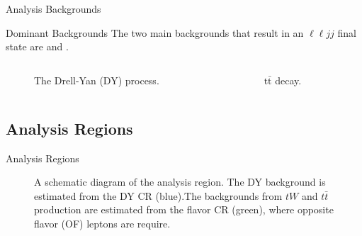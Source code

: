 \documentclass[aspectratio=169]{beamer}
\begin{document}
\begin{frame}{Analysis Backgrounds}
  \begin{block}{Dominant Backgrounds}
    The two main backgrounds that result in an $\ell \ell j j$ final state are 
     and .
  \end{block}
  \vfill
  \begin{columns}
    \begin{column}{0.5\textwidth}
      \begin{figure}
        \centering
        
        \caption{The Drell-Yan (DY) process.}
      \end{figure}
    \end{column}
    \begin{column}{0.5\textwidth}
      \begin{figure}
        \centering
        
        \caption{$\mathrm{t\bar{t}}$ decay.}
      \end{figure}
    \end{column}
  \end{columns}
  \centering
\end{frame}

\subsection{Analysis Regions}

\begin{frame}{Analysis Regions}
  \begin{figure}
    \centering
    
    \caption{A schematic diagram of the analysis region. The DY background is estimated from 
    the DY CR (blue).The backgrounds from $tW$ and $t\bar{t}$ production are estimated from the flavor CR 
    (green), where opposite flavor (OF) leptons are require.}
    \label{fig:dm-mass-scale}
  \end{figure}
\end{frame}
\end{document}
